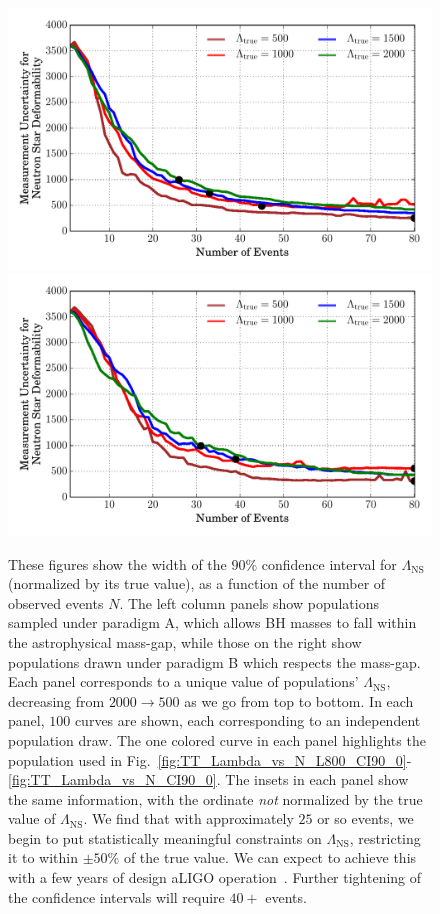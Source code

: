 \documentclass[aps,prd,amsmath,floats,floatfix, twocolumn,
superscriptaddress,nofootinbib,showpacs]{revtex4-1}
\newcommand{\lambdans}{\Lambda_\mathrm{NS}}
\begin{document}
\begin{figure}
\centering    
\includegraphics[width=\columnwidth]{plots/LambdaCIWidths90pc_vs_N_AllPopulation.pdf}
\includegraphics[width=\columnwidth]{plots/LambdaCIWidths90pc_vs_N_AstroPopulation.pdf}
\caption{%
These figures show the width of the $90\%$ confidence interval for $\lambdans$
(normalized by its true value), as a function of the number of observed events
$N$. The left column panels show populations sampled under paradigm A, which
allows BH masses to fall within the astrophysical mass-gap, while those on the
right show populations drawn under paradigm B which respects the mass-gap.
Each panel corresponds to a unique value of populations' $\lambdans$,
decreasing from $2000\rightarrow 500$ as we go from top to bottom. In each panel,
$100$ curves are shown, each corresponding to an independent population draw. The
one colored curve in each panel highlights the population used in
Fig.~\ref{fig:TT_Lambda_vs_N_L800_CI90_0}-\ref{fig:TT_Lambda_vs_N_CI90_0}.
The insets in each panel show the same information, with the ordinate {\it not}
normalized by the true value of $\lambdans$.
% 
We find that with approximately $25$ or so events, we begin to put
statistically meaningful constraints on $\lambdans$, restricting it to within
$\pm 50\%$ of the true value. We can expect to achieve this with a few years
of design aLIGO operation~\cite{Abadie:2010cfa}. Further tightening of the
confidence intervals will require $40+$ events.
}
\label{fig:TT_LambdaError_vs_N_L500_2000_CI90_0_AllInOne}
\end{figure}
% 
\end{document}
